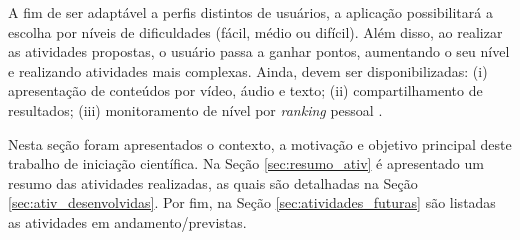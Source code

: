A fim de ser adaptável a perfis distintos de usuários, a aplicação possibilitará a escolha por níveis de dificuldades (fácil, médio ou difícil). Além disso, ao realizar as atividades propostas, o usuário passa a ganhar pontos, aumentando o seu nível e realizando atividades mais complexas. Ainda, devem ser disponibilizadas: (i) apresentação de conteúdos por vídeo, áudio e texto; (ii) compartilhamento de resultados; (iii) monitoramento de nível por \textit{ranking} pessoal \citep{oliveira2018crossword}. 

Nesta seção foram apresentados o contexto, a motivação e objetivo principal deste trabalho de iniciação científica. Na Seção \ref{sec:resumo_ativ} é apresentado um resumo das atividades realizadas, as quais são detalhadas na Seção \ref{sec:ativ_desenvolvidas}. Por fim, na Seção \ref{sec:atividades_futuras} são listadas as atividades em andamento/previstas. %